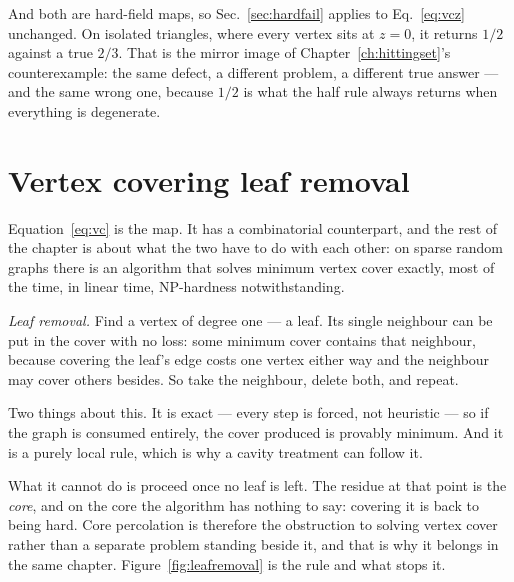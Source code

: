 And both are hard-field maps, so Sec.~\ref{sec:hardfail} applies to
Eq.~\eqref{eq:vcz} unchanged. On isolated triangles, where every vertex sits at
$z=0$, it returns $1/2$ against a true $2/3$. That is the mirror image of
Chapter~\ref{ch:hittingset}'s counterexample: the same defect, a different
problem, a different true answer --- and the same wrong one, because $1/2$ is
what the half rule always returns when everything is degenerate.

\section{Vertex covering leaf removal}
\label{sec:leafremoval}

Equation~\eqref{eq:vc} is the map. It has a combinatorial counterpart, and the
rest of the chapter is about what the two have to do with each other: on sparse
random graphs there is an algorithm that solves minimum vertex cover exactly,
most of the time, in linear time, NP-hardness notwithstanding.

\emph{Leaf removal.} Find a vertex of degree one --- a leaf. Its single
neighbour can be put in the cover with no loss: some minimum cover contains that
neighbour, because covering the leaf's edge costs one vertex either way and the
neighbour may cover others besides. So take the neighbour, delete both, and
repeat.

Two things about this. It is exact --- every step is forced, not heuristic --- so
if the graph is consumed entirely, the cover produced is provably minimum. And
it is a purely local rule, which is why a cavity treatment can follow it.

What it cannot do is proceed once no leaf is left. The residue at that point is
the \emph{core}, and on the core the algorithm has nothing to say: covering it
is back to being hard. Core percolation is therefore the obstruction to solving
vertex cover rather than a separate problem standing beside it, and that is why
it belongs in the same chapter. Figure~\ref{fig:leafremoval} is the rule
and what stops it.


